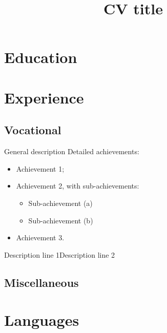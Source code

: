 \documentclass[11pt,a4paper,sans]{moderncv}%
\title{CV title}
\begin{document}
\makecvtitle
\section{Education}
\section{Experience}
\subsection{Vocational}
  {General description\newline{}%
Detailed achievements:%
\begin{itemize}%
\item Achievement 1;
\item Achievement 2, with sub-achievements:
  \begin{itemize}%
  \item Sub-achievement (a)
  \item Sub-achievement (b)
  \end{itemize}
\item Achievement 3.
\end{itemize}}
  {Description line 1\newline{}Description line 2}
\subsection{Miscellaneous}
\section{Languages}
\end{document}
